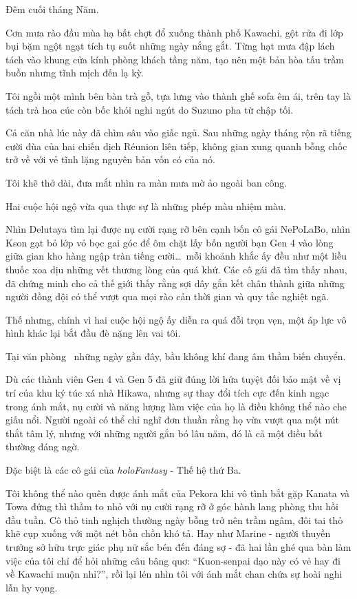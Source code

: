 \documentclass[../main.tex]{subfiles}
\begin{document}


Đêm cuối tháng Năm.

Cơn mưa rào đầu mùa hạ bất chợt đổ xuống thành phố Kawachi, gột rửa đi lớp bụi bặm ngột ngạt tích tụ suốt những ngày nắng gắt. Từng hạt mưa đập lách tách vào khung cửa kính phòng khách tầng năm, tạo nên một bản hòa tấu trầm buồn nhưng tĩnh mịch đến lạ kỳ.

Tôi ngồi một mình bên bàn trà gỗ, tựa lưng vào thành ghế sofa êm ái, trên tay là tách trà hoa cúc còn bốc khói nghi ngút do Suzuno pha từ chập tối.

Cả căn nhà lúc này đã chìm sâu vào giấc ngủ. Sau những ngày tháng rộn rã tiếng cười đùa của hai chiến dịch Réunion liên tiếp, không gian xung quanh bỗng chốc trở về với vẻ tĩnh lặng nguyên bản vốn có của nó.

Tôi khẽ thở dài, đưa mắt nhìn ra màn mưa mờ ảo ngoài ban công.

Hai cuộc hội ngộ vừa qua thực sự là những phép màu nhiệm màu.

Nhìn Delutaya tìm lại được nụ cười rạng rỡ bên cạnh bốn cô gái NePoLaBo, nhìn Kson gạt bỏ lớp vỏ bọc gai góc để ôm chặt lấy bốn người bạn Gen 4 vào lòng giữa gian kho hàng ngập tràn tiếng cười\dots\ mỗi khoảnh khắc ấy đều như một liều thuốc xoa dịu những vết thương lòng của quá khứ. Các cô gái đã tìm thấy nhau, đã chứng minh cho cả thế giới thấy rằng sợi dây gắn kết chân thành giữa những người đồng đội có thể vượt qua mọi rào cản thời gian và quy tắc nghiệt ngã.

Thế nhưng, chính vì hai cuộc hội ngộ ấy diễn ra quá đỗi trọn vẹn, một áp lực vô hình khác lại bắt đầu đè nặng lên vai tôi.

Tại văn phòng \hll\ những ngày gần đây, bầu không khí đang âm thầm biến chuyển.

Dù các thành viên Gen 4 và Gen 5 đã giữ đúng lời hứa tuyệt đối bảo mật về vị trí của khu ký túc xá nhà Hikawa, nhưng sự thay đổi tích cực đến kinh ngạc trong ánh mắt, nụ cười và năng lượng làm việc của họ là điều không thể nào che giấu nổi. Người ngoài có thể chỉ nghĩ đơn thuần rằng họ vừa vượt qua một nút thắt tâm lý, nhưng với những người gắn bó lâu năm, đó là cả một điều bất thường đáng ngờ.

Đặc biệt là các cô gái của \textit{holoFantasy} - Thế hệ thứ Ba.

Tôi không thể nào quên được ánh mắt của Pekora khi vô tình bắt gặp Kanata và Towa đứng thì thầm to nhỏ với nụ cười rạng rỡ ở góc hành lang phòng thu hồi đầu tuần. Cô thỏ tinh nghịch thường ngày bỗng trở nên trầm ngâm, đôi tai thỏ khẽ cụp xuống với một nét bồn chồn khó tả. Hay như Marine - người thuyền trưởng sở hữu trực giác phụ nữ sắc bén đến đáng sợ - đã hai lần ghé qua bàn làm việc của tôi chỉ để hỏi những câu bâng quơ: ``Kuon-senpai dạo này có vẻ hay đi về Kawachi muộn nhỉ?'', rồi lại lén nhìn tôi với ánh mắt chan chứa sự hoài nghi lẫn hy vọng.
\end{document}
